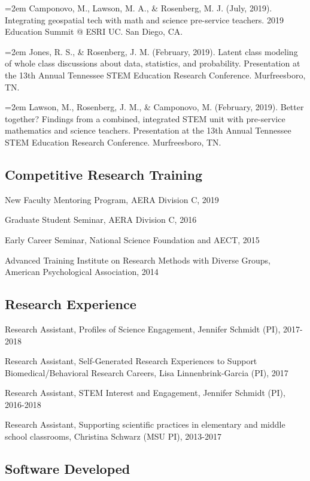 \documentclass[14,]{article}
\begin{document}
\hangindent=2em Camponovo, M., Lawson, M. A., \& Rosenberg, M. J. (July,
2019). Integrating geospatial tech with math and science pre-service
teachers. 2019 Education Summit @ ESRI UC. San Diego, CA.

\hangindent=2em Jones, R. S., \& Rosenberg, J. M. (February, 2019).
Latent class modeling of whole class discussions about data, statistics,
and probability. Presentation at the 13th Annual Tennessee STEM
Education Research Conference. Murfreesboro, TN.

\hangindent=2em Lawson, M., Rosenberg, J. M., \& Camponovo, M.
(February, 2019). Better together? Findings from a combined, integrated
STEM unit with pre-service mathematics and science teachers.
Presentation at the 13th Annual Tennessee STEM Education Research
Conference. Murfreesboro, TN.

\hypertarget{competitive-research-training}{%
\subsection{Competitive Research
Training}\label{competitive-research-training}}

New Faculty Mentoring Program, AERA Division C, 2019

Graduate Student Seminar, AERA Division C, 2016

Early Career Seminar, National Science Foundation and AECT, 2015

Advanced Training Institute on Research Methods with Diverse Groups,
American Psychological Association, 2014

\hypertarget{research-experience}{%
\subsection{Research Experience}\label{research-experience}}

Research Assistant, Profiles of Science Engagement, Jennifer Schmidt
(PI), 2017-2018

Research Assistant, Self-Generated Research Experiences to Support
Biomedical/Behavioral Research Careers, Lisa Linnenbrink-Garcia (PI),
2017

Research Assistant, STEM Interest and Engagement, Jennifer Schmidt (PI),
2016-2018

Research Assistant, Supporting scientific practices in elementary and
middle school classrooms, Christina Schwarz (MSU PI), 2013-2017

\hypertarget{software-developed}{%
\subsection{Software Developed}\label{software-developed}}
\end{document}

